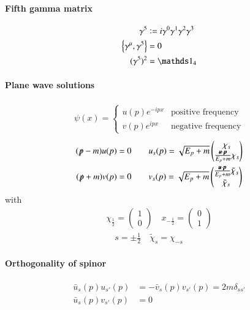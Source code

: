 \paragraph{Fifth gamma matrix}
\begin{align}
	\gamma^5 &\defeq i \gamma^0 \gamma^1 \gamma^2 \gamma^3 \\
	\left\{ \gamma^\mu, \gamma^5 \right\} &= 0 \\
	(\gamma^5)^2 &= \id_4
\end{align}
\paragraph{Plane wave solutions}
\begin{align}
	\psi(x) = \begin{cases}
		u(p) e^{-ipx} & \text{positive frequency} \\
		v(p) e^{ipx} & \text{negative frequency}
	\end{cases}
\end{align}
\begin{align}
	(\slashed{p}-m)u(p) &= 0 \quad && u_s(p) = \sqrt{E_p+m} \begin{pmatrix} \chi_s \\ \frac{\pmb{u}\cdot\pmb{p}}{E_p+m}\chi_s\end{pmatrix}  \\
	(\slashed{p}+m)v(p) &= 0 \quad && v_s(p) = \sqrt{E_p+m} \begin{pmatrix} \frac{\pmb{u}\cdot\pmb{p}}{E_p+m}\tilde{\chi}_s \\ \tilde{\chi}_s \end{pmatrix} 
\end{align}
with
\begin{align*}
	\chi_{\frac{1}{2}} = \begin{pmatrix} 1 \\ 0 \end{pmatrix} \quad x_{-\frac{1}{2}} = \begin{pmatrix} 0 \\ 1\end{pmatrix} \\
	\quad s=\pm\frac{1}{2} \quad \tilde{\chi}_s = \chi_{-s}
\end{align*}
\paragraph{Orthogonality of spinor}
\begin{align}
	\bar{u}_s(p) u_{s'}(p) &= -\bar{v}_s(p) v_{s'}(p) = 2m \delta_{ss'} \\
	\bar{u}_s(p) v_{s'}(p) &= 0
\end{align}
